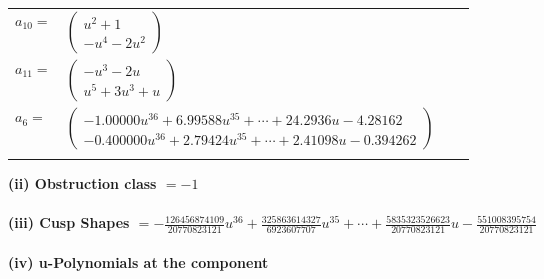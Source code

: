 \documentclass[1p]{elsarticle_modified}
\theoremstyle{definition}
\begin{document}
\begin{tabular}{m{7pt} m{180pt} m{7pt} m{180pt} }
\flushright $a_{10}=$&$\begin{pmatrix}u^2+1\\- u^4-2 u^2\end{pmatrix}$ \\
\flushright $a_{11}=$&$\begin{pmatrix}- u^3-2 u\\u^5+3 u^3+u\end{pmatrix}$ \\
\flushright $a_{6}=$&$\begin{pmatrix}-1.00000 u^{36}+6.99588 u^{35}+\cdots+24.2936 u-4.28162\\-0.400000 u^{36}+2.79424 u^{35}+\cdots+2.41098 u-0.394262\end{pmatrix}$\\&\end{tabular}
\flushleft \textbf{(ii) Obstruction class $= -1$}\\~\\
\flushleft \textbf{(iii) Cusp Shapes $= -\frac{126456874109}{20770823121} u^{36}+\frac{325863614327}{6923607707} u^{35}+\cdots+\frac{5835323526623}{20770823121} u-\frac{551008395754}{20770823121}$}\\~\\
\newpage\renewcommand{\arraystretch}{1}
\flushleft \textbf{(iv) u-Polynomials at the component}\newline \\
\end{document}
